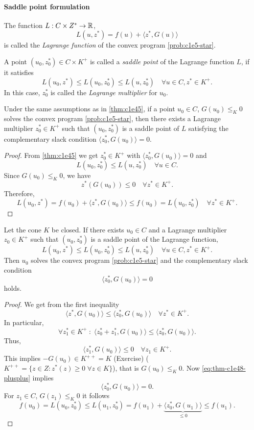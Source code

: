 \documentclass[../skript.tex]{subfiles}
\begin{document}
\paragraph{Saddle point formulation}
\begin{definition} %
\label{def:c1e46}
The function $L : C \times Z^* \to \mathbb{R}$,
\[
	L(u, z^*) = f(u) + \langle z^*, G(u) \rangle
\]
is called the \emph{Lagrange function} of the convex program \cref{prob:c1e5-star}.

A point $(u_0, z_0^*) \in C \times K^+$ is called a \emph{saddle point} of the Lagrange function $L$, if it satisfies
\[
	L(u_0, z^*) \leq L(u_0, z_0^*) \leq L(u, z_0^*) \quad \forall u \in C, z^* \in K^+.
\]
In this case, $z_0^*$ is called the \emph{Lagrange multiplier} for $u_0$.
\end{definition}
\begin{theorem} %
\label{thm:c1e47}
Under the same assumptions as in \cref{thm:c1e45}, if a point $u_0 \in C$, $G(u_0) \leq_K 0$ solves the convex program \cref{prob:c1e5-star}, then there exists a Lagrange multiplier $z_0^* \in K^+$ such that $(u_0, z_0^*)$ is a saddle point of $L$ satisfying the complementary slack condition $\langle z_0^*, G(u_0) \rangle = 0$.
\end{theorem}
\begin{proof}
From \cref{thm:c1e45} we get $z_0^* \in K^+$ with $\langle z_0^*, G(u_0) \rangle = 0$ and
\[
	L(u_0, z_0^*) \leq L(u, z_0^*) \quad \forall u \in C.
\]
Since $G(u_0) \leq_K 0$, we have 
\[
	z^*(G(u_0)) \leq 0 \quad \forall z^* \in K^+.
\]
Therefore,
\[
	L(u_0, z^*) = f(u_0) + \langle z^*, G(u_0) \rangle \leq f(u_0) = L(u_0, z_0^*) \quad \forall z^* \in K^+.
\]
\end{proof}
\begin{theorem} %
\label{thm:c1e48}
Let the cone $K$ be closed. If there exists $u_0 \in C$ and a Lagrange multiplier $z_0 \in K^+$ such that $(u_0, z_0^*)$ is a saddle point of the Lagrange function,
\[
	L(u_0, z^*) \leq L(u_0, z_0^*) \leq L(u, z_0^*) \quad \forall u \in C, z^* \in K^+.
\]
Then $u_0$ solves the convex program \cref{prob:c1e5-star} and the complementary slack condition
\[
	\langle z^*_0, G(u_0) \rangle = 0
\]
holds.
\end{theorem}
\begin{proof}
We get from the first inequality
\begin{equation}
\tag{++}
\label{eq:thm-c1e48-plusplus}
\langle z^*, G(u_0) \rangle \leq \langle z_0^*, G(u_0) \rangle \quad \forall z^* \in K^+.
\end{equation}
In particular,
\[
	\forall z_1^* \in K^+ \; : \; \langle z_0^* + z_1^*, G(u_0) \rangle \leq \langle z_0^*, G(u_0) \rangle.
\]
Thus,
\[
	\langle z_1^*, G(u_0) \rangle \leq 0 \quad \forall z_1 \in K^+.
\]
This implies $-G(u_0) \in K^{++} = K$ (Exercise) ($K^{++} = \{ z \in Z : z^*(z) \geq 0 \; \forall z \in K\}$),
that is $G(u_0) \leq_K 0$. Now \cref{eq:thm-c1e48-plusplus} implies
\[
	\langle z_0^*, G(u_0) \rangle = 0.
\]
For $z_1 \in C$, $G(z_1) \leq_K 0$ it follows
\[
	f(u_0) = L(u_0, z_0^*) \leq L(u_1, z_0^*) = f(u_1) + \underbrace{ \langle z_0^*, G(u_1) \rangle }_{\leq 0} \leq f(u_1).
\]
\end{proof}
\end{document}
